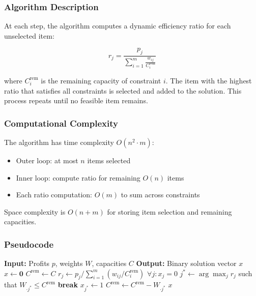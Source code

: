 \documentclass[12pt,a4paper]{article}
\begin{document}
\subsubsection{Algorithm Description}

At each step, the algorithm computes a dynamic efficiency ratio for each unselected item:

\begin{equation}
r_j = \frac{p_j}{\sum_{i=1}^{m} \frac{w_{ij}}{C_i^{\text{rem}}}}
\end{equation}

where $C_i^{\text{rem}}$ is the remaining capacity of constraint $i$. The item with the highest ratio that satisfies all constraints is selected and added to the solution. This process repeats until no feasible item remains.

\subsubsection{Computational Complexity}

The algorithm has time complexity $O(n^2 \cdot m)$:
\begin{itemize}
    \item Outer loop: at most $n$ items selected
    \item Inner loop: compute ratio for remaining $O(n)$ items
    \item Each ratio computation: $O(m)$ to sum across constraints
\end{itemize}

Space complexity is $O(n + m)$ for storing item selection and remaining capacities.

\subsubsection{Pseudocode}

\begin{algorithm}[H]
\caption{Toyoda Algorithm}
\begin{algorithmic}[1]
\State \textbf{Input:} Profits $p$, weights $W$, capacities $C$
\State \textbf{Output:} Binary solution vector $x$
\State $x \gets \mathbf{0}$ 
\State $C^{\text{rem}} \gets C$ 
    \State $r_j \gets p_j / \sum_{i=1}^{m} (w_{ij} / C_i^{\text{rem}})$ \quad $\forall j : x_j = 0$
    \State $j^* \gets \arg\max_j r_j$ such that $W_{\cdot j^*} \leq C^{\text{rem}}$
        \State \textbf{break} 
    \EndIf
    \State $x_{j^*} \gets 1$
    \State $C^{\text{rem}} \gets C^{\text{rem}} - W_{\cdot j^*}$
\EndWhile
\State \Return $x$
\end{algorithmic}
\end{algorithm}
\end{document}
